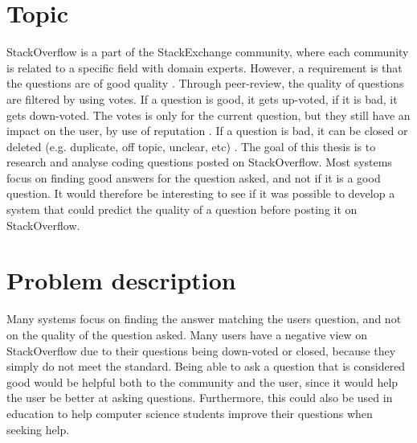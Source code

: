 \label{chap:introduction}

\section{Topic}
\label{sec:topic_covered}
StackOverflow is a part of the StackExchange community, where each community is related to a specific field with 
 domain experts. However, a requirement is that the questions are of good quality \cite{Stackoverflow.com2016a, 
 	 Stackoverflow.com2016d, Stackoverflow.com2016e}. Through peer-review, the quality of questions are filtered 
  by using votes. If a question is good, it gets up-voted, if it is bad, it gets down-voted. The votes is only 
   for the current question, but they still have an impact on the user, by use of reputation 
   \cite{Stackoverflow.com2016c}. If a question is bad, it can be closed or deleted (e.g. duplicate, off topic, 
  unclear, etc) \cite{Stackoverflow.com2016b}. 
\vspace{0.5em}\newline
The goal of this thesis is to research and analyse coding questions posted on StackOverflow. Most systems focus 
on finding good answers for the question asked, and not if it is a good question. It would therefore 
be interesting to see if it was possible to develop a system that could predict the quality of a question before 
posting it on StackOverflow.

\section{Problem description}
\label{sec:problem_description}
Many systems focus on finding the answer matching the users question, and not on the quality of the question 
 asked. Many users have a negative view on StackOverflow due to their questions being down-voted or closed, 
because they simply do not meet the standard. Being able to ask a question that is considered good would be 
 helpful both to the community and the user, since it would help the user be better at asking questions. 
Furthermore, this could also be used in education to help computer science students improve their 
questions when seeking help.


